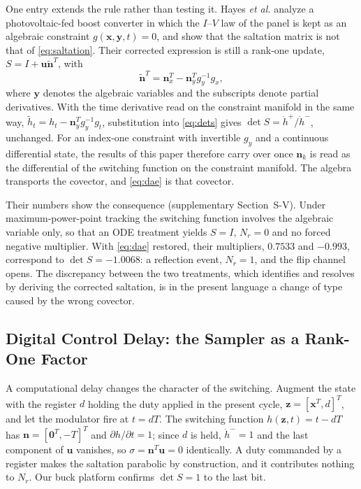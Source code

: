 \documentclass[journal]{IEEEtran}
\begin{document}
One entry extends the rule rather than testing it. Hayes \emph{et al.}
\cite{hayes2020application} analyze a photovoltaic-fed boost converter in
which the $I$--$V$ law of the panel is kept as an algebraic constraint
$g(\bm{x},\bm{y},t)=0$, and show that the saltation matrix is not that of
\eqref{eq:saltation}. Their corrected expression is still a rank-one update,
$S=I+\bm{u}\tilde{\bm{n}}^{T}$, with
\begin{equation}
\tilde{\bm{n}}^{T}=\bm{n}_x^{T}-\bm{n}_y^{T}g_y^{-1}g_x ,
\label{eq:dae}
\end{equation}
where $\bm{y}$ denotes the algebraic variables and the subscripts denote
partial derivatives. With the time derivative read on the constraint
manifold in the same way, $\tilde h_t=h_t-\bm{n}_y^{T}g_y^{-1}g_t$,
substitution into \eqref{eq:dets} gives $\det S=\dot h^{+}/\dot h^{-}$,
unchanged. For an index-one constraint with invertible $g_y$ and a
continuous differential state, the results of this paper therefore carry
over once $\bm{n}_k$ is read as the differential of the switching function
on the constraint manifold. The algebra transports the covector, and
\eqref{eq:dae} is that covector.

Their numbers show the consequence (supplementary Section~S-V). Under
maximum-power-point tracking the switching function involves the algebraic
variable only, so that an ODE treatment yields $S=I$, $N_r=0$ and no forced
negative multiplier. With \eqref{eq:dae} restored, their multipliers,
$0.7533$ and $-0.993$, correspond to $\det S=-1.0068$: a reflection event,
$N_r=1$, and the flip channel opens. The discrepancy between the two
treatments, which \cite{hayes2020application} identifies and resolves by
deriving the corrected saltation, is in the present language a change of
type caused by the wrong covector.

\subsection{Digital Control Delay: the Sampler as a Rank-One Factor}
\label{sec:retardo}
A computational delay changes the character of the switching. Augment the
state with the register $d$ holding the duty applied in the present cycle,
$\bm{z}=[\bm{x}^{T},d]^{T}$, and let the modulator fire at $t=dT$. The
switching function $h(\bm{z},t)=t-dT$ has $\bm{n}=[\bm{0}^{T},-T]^{T}$ and
$\partial h/\partial t=1$; since $d$ is held, $\dot h^{-}=1$ and the last
component of $\bm{u}$ vanishes, so $\sigma=\bm{n}^{T}\bm{u}=0$ identically. A
duty commanded by a register makes the saltation parabolic by construction,
and it contributes nothing to $N_r$. Our buck platform confirms $\det S=1$ to
the last bit.
\end{document}
